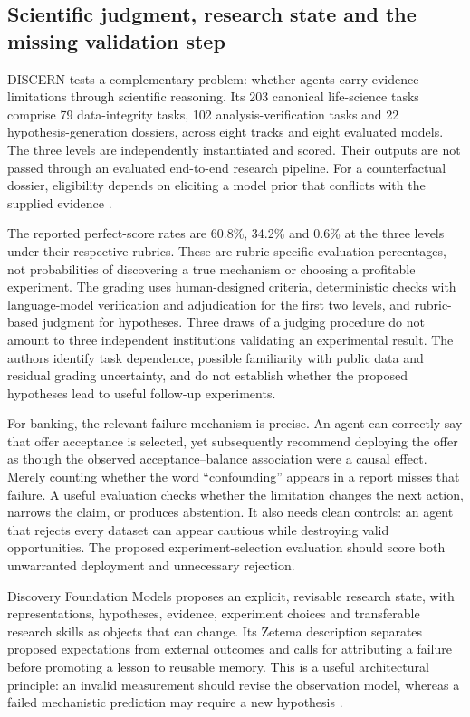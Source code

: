 \subsection{Scientific judgment, research state and the missing validation step}

DISCERN tests a complementary problem: whether agents carry evidence
limitations through scientific reasoning. Its 203 canonical life-science tasks
comprise 79 data-integrity tasks, 102 analysis-verification tasks and 22
hypothesis-generation dossiers, across eight tracks and eight evaluated models.
The three levels are independently instantiated and scored. Their outputs
are not passed through an evaluated end-to-end research pipeline. For a
counterfactual dossier, eligibility depends on eliciting a model prior that
conflicts with the supplied evidence
\citep{exec13_active_2609_33357}.

The reported perfect-score rates are 60.8\%, 34.2\% and 0.6\% at the three
levels under their respective rubrics. These are rubric-specific evaluation
percentages, not probabilities of discovering a true mechanism or choosing
a profitable experiment. The grading uses human-designed criteria,
deterministic checks with language-model verification and adjudication for
the first two levels, and rubric-based judgment for hypotheses. Three draws
of a judging procedure do not amount to three independent institutions
validating an experimental result. The authors identify task dependence,
possible familiarity with public data and residual grading uncertainty, and
do not establish whether the proposed hypotheses lead to useful follow-up
experiments.

For banking, the relevant failure mechanism is precise. An agent can correctly
say that offer acceptance is selected, yet subsequently recommend deploying
the offer as though the observed acceptance--balance association were a causal
effect. Merely counting whether the word ``confounding'' appears in a report
misses that failure. A useful evaluation checks whether the limitation changes
the next action, narrows the claim, or produces abstention. It also needs clean
controls: an agent that rejects every dataset can appear cautious while
destroying valid opportunities. The proposed experiment-selection evaluation
should score both unwarranted deployment and unnecessary rejection.

Discovery Foundation Models proposes an explicit, revisable research state,
with representations, hypotheses, evidence, experiment choices and transferable
research skills as objects that can change. Its Zetema description separates
proposed expectations from external outcomes and calls for attributing a
failure before promoting a lesson to reusable memory. This is a useful
architectural principle: an invalid measurement should revise the observation
model, whereas a failed mechanistic prediction may require a new hypothesis
\citep{exec13_active_2609_15973}.

